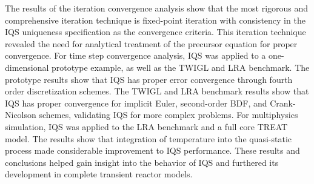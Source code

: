 The results of the iteration convergence analysis show that the most rigorous and comprehensive iteration technique is fixed-point iteration with consistency in the IQS uniqueness specification as the convergence criteria. This iteration technique revealed the need for analytical treatment of the precursor equation for proper convergence. For time step convergence analysis, IQS was applied to a one-dimensional prototype example, as well as the TWIGL and LRA benchmark.  The prototype results show that IQS has proper error convergence through fourth order discretization schemes. The TWIGL and LRA benchmark results show that IQS has proper convergence for implicit Euler, second-order BDF, and Crank-Nicolson schemes, validating IQS for more complex problems. For multiphysics simulation, IQS was applied to the LRA benchmark and a full core TREAT model. The results show that integration of temperature into the quasi-static process made considerable improvement to IQS performance. These results and conclusions helped gain insight into the behavior of IQS and furthered its development in complete transient reactor models.


 

\pagebreak{}
